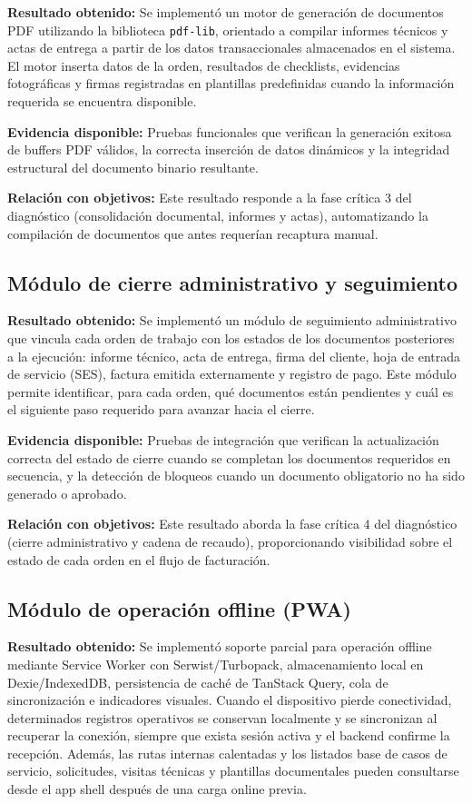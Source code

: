 \textbf{Resultado obtenido:} Se implementó un motor de generación de documentos PDF utilizando la biblioteca \texttt{pdf-lib}, orientado a compilar informes técnicos y actas de entrega a partir de los datos transaccionales almacenados en el sistema. El motor inserta datos de la orden, resultados de checklists, evidencias fotográficas y firmas registradas en plantillas predefinidas cuando la información requerida se encuentra disponible.

\textbf{Evidencia disponible:} Pruebas funcionales que verifican la generación exitosa de buffers PDF válidos, la correcta inserción de datos dinámicos y la integridad estructural del documento binario resultante.

\textbf{Relación con objetivos:} Este resultado responde a la fase crítica 3 del diagnóstico (consolidación documental, informes y actas), automatizando la compilación de documentos que antes requerían recaptura manual.

\subsection{Módulo de cierre administrativo y seguimiento}

\textbf{Resultado obtenido:} Se implementó un módulo de seguimiento administrativo que vincula cada orden de trabajo con los estados de los documentos posteriores a la ejecución: informe técnico, acta de entrega, firma del cliente, hoja de entrada de servicio (SES), factura emitida externamente y registro de pago. Este módulo permite identificar, para cada orden, qué documentos están pendientes y cuál es el siguiente paso requerido para avanzar hacia el cierre.

\textbf{Evidencia disponible:} Pruebas de integración que verifican la actualización correcta del estado de cierre cuando se completan los documentos requeridos en secuencia, y la detección de bloqueos cuando un documento obligatorio no ha sido generado o aprobado.

\textbf{Relación con objetivos:} Este resultado aborda la fase crítica 4 del diagnóstico (cierre administrativo y cadena de recaudo), proporcionando visibilidad sobre el estado de cada orden en el flujo de facturación.

\subsection{Módulo de operación offline (PWA)}

\textbf{Resultado obtenido:} Se implementó soporte parcial para operación offline mediante Service Worker con Serwist/Turbopack, almacenamiento local en Dexie/IndexedDB, persistencia de caché de TanStack Query, cola de sincronización e indicadores visuales. Cuando el dispositivo pierde conectividad, determinados registros operativos se conservan localmente y se sincronizan al recuperar la conexión, siempre que exista sesión activa y el backend confirme la recepción. Además, las rutas internas calentadas y los listados base de casos de servicio, solicitudes, visitas técnicas y plantillas documentales pueden consultarse desde el app shell después de una carga online previa.

